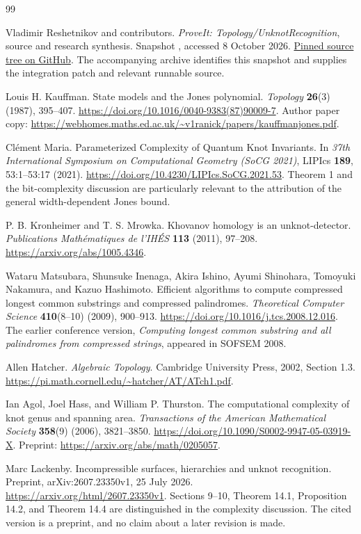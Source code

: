 \clearpage
\begin{thebibliography}{99}

Vladimir Reshetnikov and contributors.
\emph{ProveIt: Topology/UnknotRecognition}, source and research synthesis.
Snapshot ,
accessed 8 October 2026.
\href{https://github.com/VladimirReshetnikov/ProveIt/tree/8a95834940cf77cdab1b39571ffc102ca8b6bede/Topology/UnknotRecognition}{Pinned source tree on GitHub}.
The accompanying archive identifies this snapshot and supplies the
integration patch and relevant runnable source.

Louis H. Kauffman.
State models and the Jones polynomial.
\emph{Topology} \textbf{26}(3) (1987), 395--407.
\url{https://doi.org/10.1016/0040-9383(87)90009-7}.
Author paper copy:
\url{https://webhomes.maths.ed.ac.uk/~v1ranick/papers/kauffmanjones.pdf}.

Cl\'ement Maria.
Parameterized Complexity of Quantum Knot Invariants.
In \emph{37th International Symposium on Computational Geometry
(SoCG 2021)}, LIPIcs \textbf{189}, 53:1--53:17 (2021).
\url{https://doi.org/10.4230/LIPIcs.SoCG.2021.53}.
Theorem 1 and the bit-complexity discussion are particularly relevant
to the attribution of the general width-dependent Jones bound.

P. B. Kronheimer and T. S. Mrowka.
Khovanov homology is an unknot-detector.
\emph{Publications Math\'ematiques de l'IH\'ES} \textbf{113}
(2011), 97--208.
\url{https://arxiv.org/abs/1005.4346}.

Wataru Matsubara, Shunsuke Inenaga, Akira Ishino, Ayumi Shinohara,
Tomoyuki Nakamura, and Kazuo Hashimoto.
Efficient algorithms to compute compressed longest common substrings
and compressed palindromes.
\emph{Theoretical Computer Science} \textbf{410}(8--10)
(2009), 900--913.
\url{https://doi.org/10.1016/j.tcs.2008.12.016}.
The earlier conference version, \emph{Computing longest common substring
and all palindromes from compressed strings}, appeared in SOFSEM 2008.

Allen Hatcher.
\emph{Algebraic Topology}.
Cambridge University Press, 2002, Section 1.3.
\url{https://pi.math.cornell.edu/~hatcher/AT/ATch1.pdf}.

Ian Agol, Joel Hass, and William P. Thurston.
The computational complexity of knot genus and spanning area.
\emph{Transactions of the American Mathematical Society}
\textbf{358}(9) (2006), 3821--3850.
\url{https://doi.org/10.1090/S0002-9947-05-03919-X}.
Preprint: \url{https://arxiv.org/abs/math/0205057}.

Marc Lackenby.
Incompressible surfaces, hierarchies and unknot recognition.
Preprint, arXiv:2607.23350v1, 25 July 2026.
\url{https://arxiv.org/html/2607.23350v1}.
Sections 9--10, Theorem 14.1, Proposition 14.2, and Theorem 14.4
are distinguished in the complexity discussion. The cited version
is a preprint, and no claim about a later revision is made.

\end{thebibliography}
